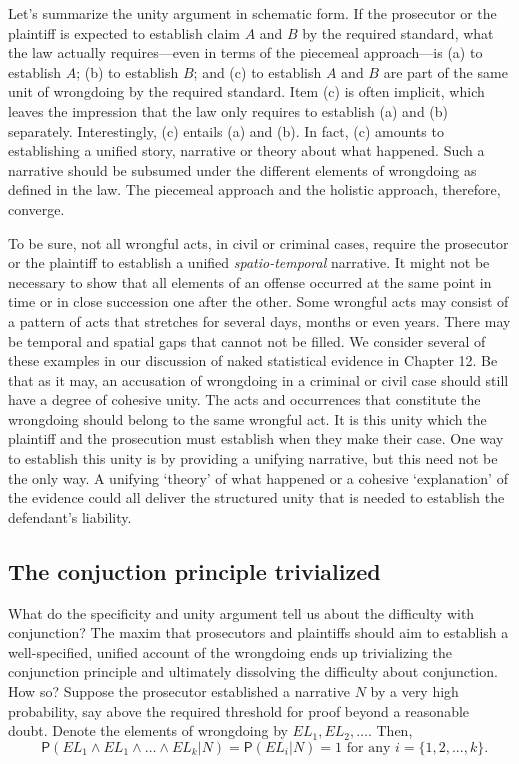 \documentclass[
  10pt,
  dvipsnames,enabledeprecatedfontcommands]{scrartcl}
\newcommand{\pr}[1]{\ensuremath{\mathsf{P}(#1)}}
\begin{document}
Let's summarize the unity argument in schematic form. If the prosecutor
or the plaintiff is expected to establish claim \(A\) and \(B\) by the
required standard, what the law actually requires---even in terms of the
piecemeal approach---is (a) to establish \(A\); (b) to establish \(B\);
and (c) to establish \(A\) and \(B\) are part of the same unit of
wrongdoing by the required standard. Item (c) is often implicit, which
leaves the impression that the law only requires to establish (a) and
(b) separately. Interestingly, (c) entails (a) and (b). In fact, (c)
amounts to establishing a unified story, narrative or theory about what
happened. Such a narrative should be subsumed under the different
elements of wrongdoing as defined in the law. The piecemeal approach and
the holistic approach, therefore, converge.

To be sure, not all wrongful acts, in civil or criminal cases, require
the prosecutor or the plaintiff to establish a unified
\emph{spatio-temporal} narrative. It might not be necessary to show that
all elements of an offense occurred at the same point in time or in
close succession one after the other. Some wrongful acts may consist of
a pattern of acts that stretches for several days, months or even years.
There may be temporal and spatial gaps that cannot not be filled. We
consider several of these examples in our discussion of naked
statistical evidence in Chapter 12.  Be that
as it may, an accusation of wrongdoing in a criminal or civil case
should still have a degree of cohesive unity. The acts and occurrences
that constitute the wrongdoing should belong to the same wrongful act.
It is this unity which the plaintiff and the prosecution must establish
when they make their case. One way to establish this unity is by
providing a unifying narrative, but this need not be the only way. A
unifying `theory' of what happened or a cohesive `explanation' of the
evidence could all deliver the structured unity that is needed to
establish the defendant's liability.

\hypertarget{the-conjuction-principle-trivialized}{%
\subsection{The conjuction principle
trivialized}\label{the-conjuction-principle-trivialized}}

What do the specificity and unity argument tell us about the difficulty
with conjunction? The maxim that prosecutors and plaintiffs should aim
to establish a well-specified, unified account of the wrongdoing ends up
trivializing the conjunction principle and ultimately dissolving the
difficulty about conjunction. How so? Suppose the prosecutor established
a narrative \(N\) by a very high probability, say above the required
threshold for proof beyond a reasonable doubt. Denote the elements of
wrongdoing by \(EL_1, EL_2, \dots\). Then,
\[\text{ $\pr{EL_1\wedge EL_1 \wedge \dots \wedge EL_k \vert N}=\pr{EL_i \vert N} = 1$ for any $i=\{1, 2, ..., k\}$}.\]
\noindent
\end{document}
